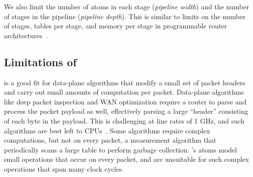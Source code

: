  We also limit the number of atoms in each stage
(\textit{pipeline width}) and the number of stages in the pipeline
(\textit{pipeline depth}). This is similar to limits on the number of stages,
tables per stage, and memory per stage in programmable router
architectures~\cite{lavanya_compiler, rmt}.

\subsection{Limitations of \absmachine}
\label{domino_ss:limitations}

\absmachine is a good fit for data-plane algorithms that modify a small set of
packet headers and carry out small amounts of computation per packet.
Data-plane algorithms like deep packet inspection and WAN optimization require
a router to parse and process the packet payload as well, effectively parsing a
large ``header'' consisting of each byte in the payload. This is challenging at
line rates of 1 GHz, and such algorithms are best left to CPUs~\cite{e2}.  Some
algorithms require complex computations, but not on every packet, \eg a
measurement algorithm that periodically scans a large table to perform garbage
collection.  \absmachine's atoms model small operations that occur on every
packet, and are unsuitable for such complex operations that span many clock
cycles.
